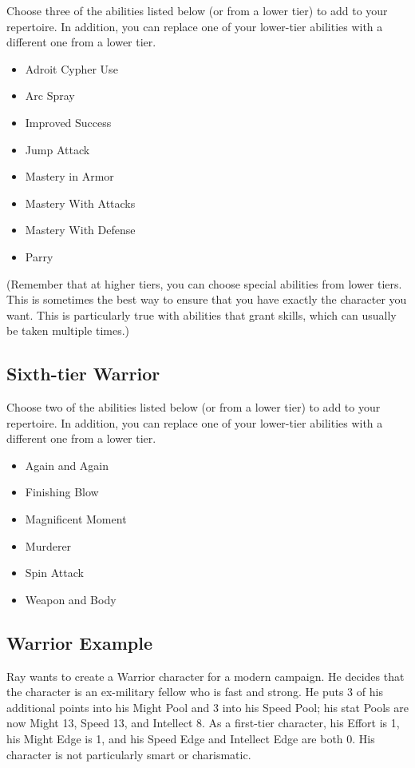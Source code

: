 \begin{multicols}{2}
Choose three of the abilities listed below (or from a lower tier) to add to your repertoire. In addition, you can replace one of your lower-tier abilities with a different one from a lower tier.

\begin{itemize}
\item Adroit Cypher Use
\item Arc Spray
\item Improved Success
\item Jump Attack
\item Mastery in Armor
\item Mastery With Attacks
\item Mastery With Defense
\item Parry
\end{itemize}

(Remember that at higher tiers, you can choose special abilities from lower tiers. This is sometimes the best way to ensure that you have exactly the character you want. This is particularly true with abilities that grant skills, which can usually be taken multiple times.)

\subsection{Sixth-tier Warrior}

Choose two of the abilities listed below (or from a lower tier) to add to your repertoire. In addition, you can replace one of your lower-tier abilities with a different one from a lower tier.

\begin{itemize}
\item Again and Again
\item Finishing Blow
\item Magnificent Moment
\item Murderer
\item Spin Attack
\item Weapon and Body
\end{itemize}

\subsection{Warrior Example}

Ray wants to create a Warrior character for a modern campaign. He decides that the character is an ex-military fellow who is fast and strong. He puts 3 of his additional points into his Might Pool and 3 into his Speed Pool; his stat Pools are now Might 13, Speed 13, and Intellect 8. As a first-tier character, his Effort is 1, his Might Edge is 1, and his Speed Edge and Intellect Edge are both 0. His character is not particularly smart or charismatic.


\end{multicols}
